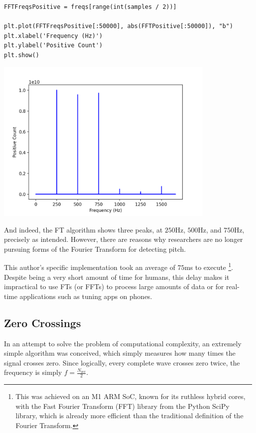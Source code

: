 \documentclass{article}
\begin{document}
\begin{verbatim}
FFTFreqsPositive = freqs[range(int(samples / 2))] 

plt.plot(FFTFreqsPositive[:50000], abs(FFTPositive[:50000]), "b")
plt.xlabel('Frequency (Hz)')
plt.ylabel('Positive Count')
plt.show()
\end{verbatim}

\begin{center} \includegraphics[width=0.8\textwidth]{img/fft_figure.png} \end{center}

And indeed, the FT algorithm shows three peaks, at $250$Hz, $500$Hz, and $750$Hz, precisely as intended. However, there are reasons why researchers are no longer pursuing forms of the Fourier Transform for detecting pitch. 

This author's specific implementation took an average of $75$ms to execute \footnote{This was achieved on an M1 ARM SoC, known for its ruthless hybrid cores, with the Fast Fourier Transform (FFT) library from the Python SciPy library, which is already more efficient than the traditional definition of the Fourier Transform.}. Despite being a very short amount of time for humans, this delay makes it impractical to use FTs (or FFTs) to process large amounts of data or for real-time applications such as tuning apps on phones.

\subsection{Zero Crossings}

In an attempt to solve the problem of computational complexity, an extremely simple algorithm was conceived, which simply measures how many times the signal crosses zero. Since logically, every complete wave crosses zero twice, the frequency is simply $f = \frac{N_{\text{zcr}}}{2}$.
\end{document}
